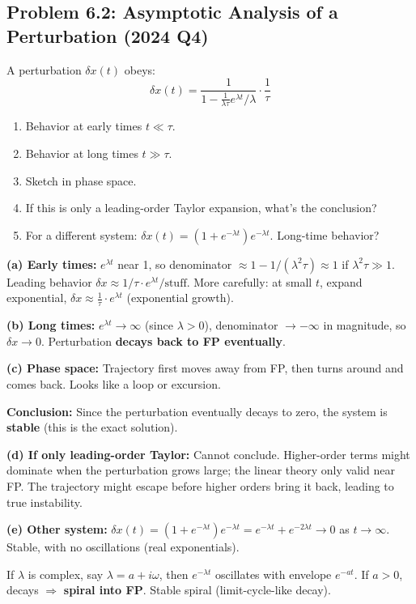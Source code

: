 \documentclass[10pt]{article}
\begin{document}
\subsection{Problem 6.2: Asymptotic Analysis of a Perturbation (2024 Q4)}

\begin{problem}
A perturbation $\delta x(t)$ obeys:
\[
\delta x(t) = \frac{1}{1 - \frac{1}{\lambda\tau}e^{\lambda t}/\lambda} \cdot \frac{1}{\tau}
\]
\begin{enumerate}[label=(\alph*)]
\item Behavior at early times $t \ll \tau$.
\item Behavior at long times $t \gg \tau$.
\item Sketch in phase space.
\item If this is only a leading-order Taylor expansion, what's the conclusion?
\item For a different system: $\delta x(t) = (1 + e^{-\lambda t})e^{-\lambda t}$. Long-time behavior?
\end{enumerate}
\end{problem}

\begin{solution}
\textbf{(a) Early times:} $e^{\lambda t}$ near 1, so denominator $\approx 1 - 1/(\lambda^2 \tau) \approx 1$ if $\lambda^2 \tau \gg 1$. Leading behavior $\delta x \approx 1/\tau \cdot e^{\lambda t}/\text{stuff}$. More carefully: at small $t$, expand exponential, $\delta x \approx \frac{1}{\tau} \cdot e^{\lambda t}$ (exponential growth).

\textbf{(b) Long times:} $e^{\lambda t} \to \infty$ (since $\lambda > 0$), denominator $\to -\infty$ in magnitude, so $\delta x \to 0$. Perturbation \textbf{decays back to FP eventually}.

\textbf{(c) Phase space:} Trajectory first moves away from FP, then turns around and comes back. Looks like a loop or excursion.

\textbf{Conclusion:} Since the perturbation eventually decays to zero, the system is \textbf{stable} (this is the exact solution).

\textbf{(d) If only leading-order Taylor:} Cannot conclude. Higher-order terms might dominate when the perturbation grows large; the linear theory only valid near FP. The trajectory might escape before higher orders bring it back, leading to true instability.

\textbf{(e) Other system:} $\delta x(t) = (1 + e^{-\lambda t})e^{-\lambda t} = e^{-\lambda t} + e^{-2\lambda t} \to 0$ as $t \to \infty$. Stable, with no oscillations (real exponentials).

If $\lambda$ is complex, say $\lambda = a + i\omega$, then $e^{-\lambda t}$ oscillates with envelope $e^{-at}$. If $a > 0$, decays $\Rightarrow$ \textbf{spiral into FP}. Stable spiral (limit-cycle-like decay).
\end{solution}
\end{document}
